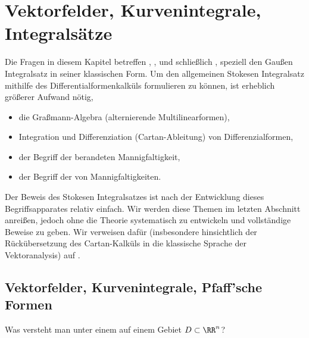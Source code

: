 \chapter{Vektorfelder, Kurvenintegrale, Integrals\"atze}

Die Fragen in diesem Kapitel betreffen , 
, 
und schließlich , 
speziell den Gauß\sch en Integralsatz 
in seiner klassischen Form. 
Um den allgemeinen Stokes\sch en Integralsatz 
mithilfe des Differentialformenkalküls formulieren zu können, 
ist erheblich größerer Aufwand nötig, {\zB} 
\begin{itemize}[2mm]
\item[\desc{i}] die Graßmann-Algebra (alternierende Multilinearformen),
\item[\desc{ii}] Integration und Differenziation (Cartan-Ableitung) von 
  Differenzialformen,
\item[\desc{iii}] der Begriff der berandeten Mannigfaltigkeit,
\item[\desc{iv}] der Begriff der  von Mannigfaltigkeiten.
\end{itemize}
Der Beweis des Stokes\sch en Integralsatzes ist nach der Entwicklung 
dieses Begriffsapparates relativ einfach. Wir werden diese Themen im letzten 
Abschnitt anreißen, jedoch ohne die Theorie systematisch zu entwickeln 
und vollständige Beweise zu geben. Wir verweisen dafür 
(insbesondere hinsichtlich der Rückübersetzung des Cartan-Kalküls in die 
klassische Sprache der Vektoranalysis) auf 
\citep{JaenichPhy}.

\section{Vektorfelder, Kurvenintegrale, Pfaff'sche Formen}

\begin{frage}
  Was versteht man unter einem  auf einem Gebiet $D\subset\RR^n$? 
\end{frage}

